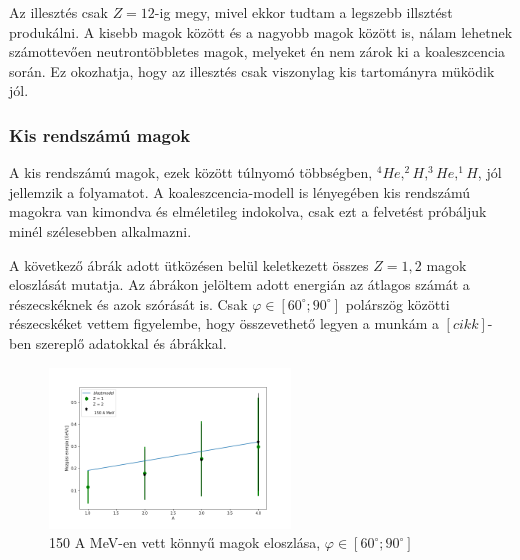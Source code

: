 \documentclass[a4paper,12pt]{article}
\begin{document}
\vspace{5mm}

\par Az illesztés csak $Z = 12$-ig megy, mivel ekkor tudtam a legszebb illsztést produkálni. A kisebb magok között és a nagyobb magok között is, nálam lehetnek számottevően neutrontöbbletes magok, melyeket én nem zárok ki a koaleszcencia során. Ez okozhatja, hogy az illesztés csak viszonylag kis tartományra müködik jól.

\vspace{5mm}

\subsubsection{ Kis rendszámú magok }

\vspace{5mm}

\par A kis rendszámú magok, ezek között túlnyomó többségben, $^{4}He, ^{2}H, ^{3}He, ^{1}H$, jól jellemzik a folyamatot. A koaleszcencia-modell is lényegében kis rendszámú magokra van kimondva és elméletileg indokolva, csak ezt a felvetést próbáljuk minél szélesebben alkalmazni. 

\vspace{5mm}

\par A következő ábrák adott ütközésen belül keletkezett összes $Z = 1, 2$ magok eloszlását mutatja. Az ábrákon jelöltem adott energián az átlagos számát a részecskéknek és azok szórását is. Csak $\varphi \in [60^{\circ};90^{\circ}]$ polárszög közötti részecskéket vettem figyelembe, hogy összevethető legyen a munkám a $[cikk]$-ben szereplő adatokkal és ábrákkal.

\begin{figure}[!htb]
\centering
\includegraphics[width=0.57\textwidth]{./konnyu_magok_150AMeV.png}
\caption{150 A MeV-en vett könnyű magok eloszlása, $\varphi \in [60^{\circ};90^{\circ}]$}
\end{figure}
\end{document}
